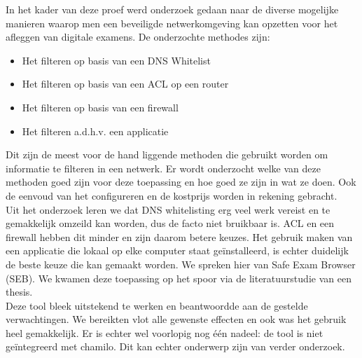 In het kader van deze proef werd onderzoek gedaan naar de diverse mogelijke manieren waarop men een beveiligde netwerkomgeving kan opzetten voor het afleggen van digitale examens. 
De onderzochte methodes zijn: 
\begin{itemize}
\item Het filteren op basis van een DNS Whitelist
\item Het filteren op basis van een ACL op een router
\item Het filteren op basis van een firewall
\item Het filteren a.d.h.v. een applicatie
\end{itemize}
Dit zijn de meest voor de hand liggende methoden die gebruikt worden om informatie te filteren in een netwerk. Er wordt onderzocht welke van deze methoden goed zijn voor deze toepassing en hoe goed ze zijn in wat ze doen. Ook de eenvoud van het configureren en de kostprijs worden in rekening gebracht. \\
Uit het onderzoek leren we dat DNS whitelisting erg veel werk vereist en te gemakkelijk omzeild kan worden, dus de facto niet bruikbaar is. ACL en een firewall hebben dit minder en zijn daarom betere keuzes. Het gebruik maken van een applicatie die lokaal op elke computer staat geïnstalleerd, is echter duidelijk de beste keuze die kan gemaakt worden. We spreken hier van Safe Exam Browser (SEB). We kwamen deze toepassing op het spoor via de literatuurstudie van een thesis.
\\
Deze tool bleek uitstekend te werken en beantwoordde aan de gestelde verwachtingen. We bereikten vlot alle gewenste effecten en ook was het gebruik heel gemakkelijk. Er is echter wel voorlopig nog één nadeel: de tool is niet geïntegreerd met chamilo. Dit kan echter onderwerp zijn van verder onderzoek.




